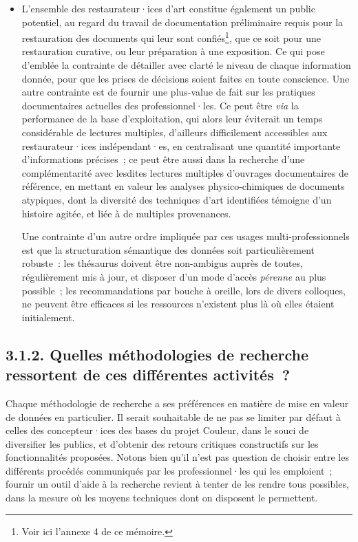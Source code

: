 \documentclass[a4paper,12pt, twoside]{book}
\begin{document}
\begin{itemize}
    \item L’ensemble des restaurateur·ices d’art constitue également un public potentiel, au regard du travail de documentation préliminaire requis pour la restauration des documents qui leur sont confiés\footnote{Voir ici l’annexe 4 de ce mémoire.}, que ce soit pour une restauration curative, ou leur préparation à une exposition. Ce qui pose d’emblée la contrainte de détailler avec clarté le niveau de chaque information donnée, pour que les prises de décisions soient faites en toute conscience. Une autre contrainte est de fournir une plus-value de fait sur les pratiques documentaires actuelles des professionnel·les. Ce peut être \textit{via} la performance de la base d’exploitation, qui alors leur éviterait un temps considérable de lectures multiples, d’ailleurs difficilement accessibles aux restaurateur·ices indépendant·es, en centralisant une quantité importante d’informations précises~; ce peut être aussi dans la recherche d’une complémentarité avec lesdites lectures multiples d’ouvrages documentaires de référence, en mettant en valeur les analyses physico-chimiques de documents atypiques, dont la diversité des techniques d’art identifiées témoigne d’un histoire agitée, et liée à de multiples provenances.
    
    \medskip
    
    Une contrainte d’un autre ordre impliquée par ces usages multi-professionnels est que la structuration sémantique des données soit particulièrement robuste~: les thésaurus doivent être non-ambigus auprès de toutes, régulièrement mis à jour, et disposer d’un mode d’accès \textit{pérenne} au plus possible~; les recommandations par bouche à oreille, lors de divers colloques, ne peuvent être efficaces si les ressources n’existent plus là où elles étaient initialement.
\end{itemize}    

\subsection*{3.1.2. Quelles méthodologies de recherche ressortent de ces différentes activités~?}

Chaque méthodologie de recherche a ses préférences en matière de mise en valeur de données en particulier. Il serait souhaitable de ne pas se limiter par défaut à celles des concepteur·ices des bases du projet Couleur, dans le souci de diversifier les publics, et d’obtenir des retours critiques constructifs sur les fonctionnalités proposées. Notons bien qu’il n’est pas question de choisir entre les différents procédés communiqués par les professionnel·les qui les emploient~; fournir un outil d’aide à la recherche revient à tenter de les rendre tous possibles, dans la mesure où les moyens techniques dont on disposent le permettent.
\end{document}
